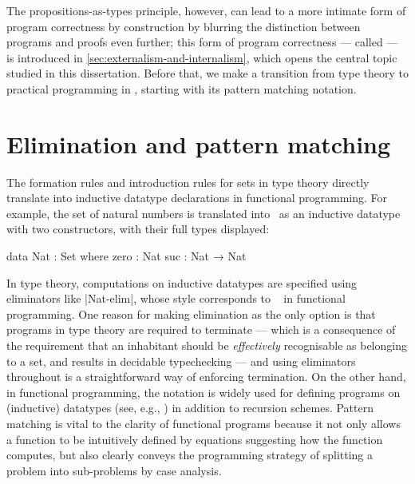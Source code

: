 The propositions-as-types principle, however, can lead to a more intimate form of program correctness by construction by blurring the distinction between programs and proofs even further; this form of program correctness --- called  --- is introduced in \autoref{sec:externalism-and-internalism}, which opens the central topic studied in this dissertation.
Before that, we make a transition from type theory to practical programming in \Agda, starting with its pattern matching notation.

\section{Elimination and pattern matching}
\label{sec:pattern-matching}

The formation rules and introduction rules for sets in type theory directly translate into inductive datatype declarations in functional programming.
For example, the set of natural numbers is translated into \Agda\ as an inductive datatype with two constructors, with their full types displayed:
\begin{code}
data Nat : Set where
  zero  : Nat
  suc   : Nat → Nat
\end{code}
In type theory, computations on inductive datatypes are specified using eliminators like |Nat-elim|, whose style corresponds to ~\citep{Meijer-bananas, Meertens-paramorphisms} in functional programming.
One reason for making elimination as the only option is that programs in type theory are required to terminate --- which is a consequence of the requirement that an inhabitant should be \emph{effectively} recognisable as belonging to a set, and results in decidable typechecking --- and using eliminators throughout is a straightforward way of enforcing termination.
On the other hand, in functional programming, the  notation is widely used for defining programs on (inductive) datatypes (see, e.g., \citet[Section~5]{Hudak-history-of-Haskell}) in addition to recursion schemes.
Pattern matching is vital to the clarity of functional programs because it not only allows a function to be intuitively defined by equations suggesting how the function computes, but also clearly conveys the programming strategy of splitting a problem into sub-problems by case analysis.

